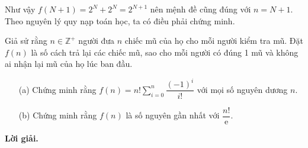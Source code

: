Như vậy $f(N+1) = 2^N + 2^N = 2^{N+1}$ nên mệnh đề cũng đúng với $n = N+1$. Theo nguyên lý quy nạp toán học, ta có điều phải chứng minh.

\begin{tcolorbox}[breakable]
    \begin{baitoan} \label{pb:w05:04}
        Giả sử rằng $n \in \mathbb{Z^+}$ người đưa $n$ chiếc mũ của họ cho mỗi người kiểm tra mũ. Đặt $f(n)$ là số cách trả lại các chiếc mũ, sao cho mỗi người có đúng 1 mũ và không ai nhận lại mũ của họ lúc ban đầu.

        \begin{enumerate}
            \item[(a)] Chứng minh rằng $\displaystyle f(n) = n! \sum\limits_{i=0}^n \dfrac{(-1)^i}{i!}$ với mọi số nguyên dương $n$.
            \item[(b)] Chứng minh rằng $f(n)$ là số nguyên gần nhất với $\dfrac{n!}{\mathrm{e}}$.
        \end{enumerate}
    \end{baitoan}
\end{tcolorbox}

\textbf{Lời giải. }


